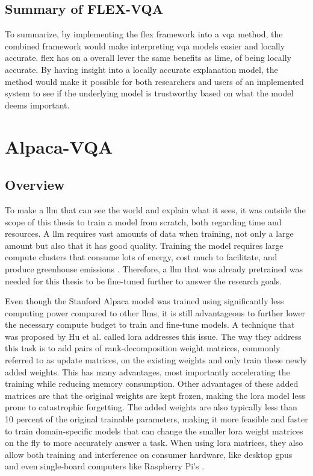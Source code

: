         \subsection{Summary of FLEX-VQA}
        To summarize, by implementing the \gls{flex} framework into a \gls{vqa} method, the combined framework would make interpreting \gls{vqa} models easier and locally accurate. \gls{flex} has on a overall lever the same benefits as \gls{lime}, of being locally accurate. By having insight into a locally accurate explanation model, the method would make it possible for both researchers and users of an implemented system to see if the underlying model is trustworthy based on what the model deems important. 




    \section{Alpaca-VQA}
    \label{sec3:alpaca_vqa}

        \subsection{Overview}
        To make a \gls{llm} that can see the world and explain what it sees, it was outside the scope of this thesis to train a model from scratch, both regarding time and resources. A \gls{llm} requires vast amounts of data when training, not only a large amount but also that it has good quality. Training the model requires large compute clusters that consume lots of energy, cost much to facilitate, and produce greenhouse emissions \cite{??}. Therefore, a \gls{llm} that was already pretrained was needed for this thesis to be fine-tuned further to answer the research goals. 

        


        Even though the Stanford Alpaca model was trained using significantly less computing power compared to other \glspl{llm}, it is still advantageous to further lower the necessary compute budget to train and fine-tune models. A technique that was proposed by Hu et al. called \gls{lora} \cite{huLoRALowRankAdaptation2021} addresses this issue. The way they address this task is to add pairs of rank-decomposition weight matrices, commonly referred to as update matrices, on the existing weights and only train these newly added weights. This has many advantages, most importantly accelerating the training while reducing memory consumption. Other advantages of these added matrices are that the original weights are kept frozen, making the \gls{lora} model less prone to catastrophic forgetting. The added weights are also typically less than 10 percent of the original trainable parameters, making it more feasible and faster to train domain-specific models that can change the smaller \gls{lora} weight matrices on the fly to more accurately answer a task. When using \gls{lora} matrices, they also allow both training and interference on consumer hardware, like desktop \glspl{gpu} and even single-board computers like Raspberry Pi's \cite{artemandreenko[@miolini]VeSucefullyRunned2023}. 


